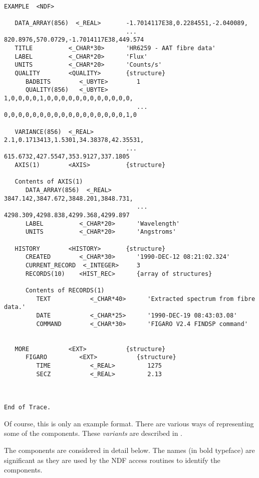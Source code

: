 \begin{verbatim}

EXAMPLE  <NDF>

   DATA_ARRAY(856)  <_REAL>       -1.7014117E38,0.2284551,-2.040089,
                                  ... 820.8976,570.0729,-1.7014117E38,449.574
   TITLE          <_CHAR*30>      'HR6259 - AAT fibre data'
   LABEL          <_CHAR*20>      'Flux'
   UNITS          <_CHAR*20>      'Counts/s'
   QUALITY        <QUALITY>       {structure}
      BADBITS        <_UBYTE>        1
      QUALITY(856)   <_UBYTE>        1,0,0,0,0,1,0,0,0,0,0,0,0,0,0,0,0,0,
                                     ... 0,0,0,0,0,0,0,0,0,0,0,0,0,0,0,0,0,1,0

   VARIANCE(856)  <_REAL>         2.1,0.1713413,1.5301,34.38378,42.35531,
                                  ... 615.6732,427.5547,353.9127,337.1805
   AXIS(1)        <AXIS>          {structure}

   Contents of AXIS(1)
      DATA_ARRAY(856)  <_REAL>       3847.142,3847.672,3848.201,3848.731,
                                     ... 4298.309,4298.838,4299.368,4299.897
      LABEL          <_CHAR*20>      'Wavelength'
      UNITS          <_CHAR*20>      'Angstroms'

   HISTORY        <HISTORY>       {structure}
      CREATED        <_CHAR*30>      '1990-DEC-12 08:21:02.324'
      CURRENT_RECORD  <_INTEGER>     3
      RECORDS(10)    <HIST_REC>      {array of structures}

      Contents of RECORDS(1)
         TEXT           <_CHAR*40>      'Extracted spectrum from fibre data.'
         DATE           <_CHAR*25>      '1990-DEC-19 08:43:03.08'
         COMMAND        <_CHAR*30>      'FIGARO V2.4 FINDSP command'


   MORE           <EXT>           {structure}
      FIGARO         <EXT>           {structure}
         TIME           <_REAL>         1275
         SECZ           <_REAL>         2.13



End of Trace.
\end{verbatim}
\newpage

Of course, this is only an example format. There are various ways of 
representing some of the components. 
These {\sl variants\/} are described in .

The components are considered in detail below.
The names (in bold typeface) are significant as they are used by the NDF 
access routines to identify the components.

